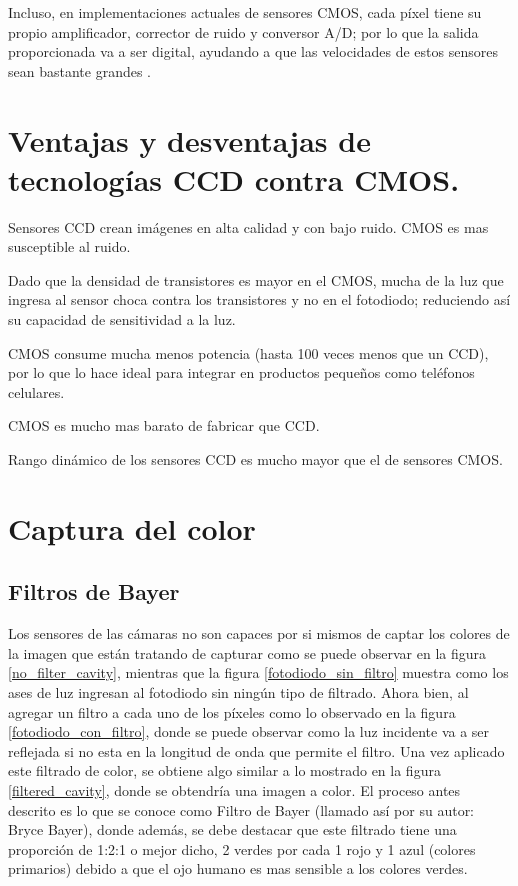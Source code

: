 \documentclass[conference]{IEEEtran}
\begin{document}
Incluso, en implementaciones actuales de sensores CMOS, cada píxel tiene su propio amplificador, corrector de ruido y conversor A/D; por lo que la salida proporcionada va a ser digital, ayudando a que las velocidades de estos sensores sean bastante grandes \cite{ccd_vs_cmos_1}.

\section{\textbf{Ventajas y desventajas de tecnologías CCD contra CMOS.}}
\begin{list}{--}{}
\item
Sensores CCD crean imágenes en alta calidad y con bajo ruido. CMOS es mas susceptible al ruido.
\item
Dado que la densidad de transistores es mayor en el CMOS, mucha de la luz que ingresa al sensor choca contra los transistores y no en el fotodiodo; reduciendo así su capacidad de sensitividad a la luz.
\item
CMOS consume mucha menos potencia (hasta 100 veces menos que un CCD), por lo que lo hace ideal para integrar en productos peque\~nos como teléfonos celulares.
\item
CMOS es mucho mas barato de fabricar que CCD.
\item
Rango dinámico de los sensores CCD es mucho mayor que el de sensores CMOS. 
\end{list}

\section{\textbf{Captura del color}}

\subsection{\textbf{Filtros de Bayer}}
Los sensores de las cámaras no son capaces por si mismos de captar los colores de la imagen que están tratando de capturar como se puede observar en la figura \ref{no_filter_cavity}, mientras que la figura \ref{fotodiodo_sin_filtro} muestra como los ases de luz ingresan al fotodiodo sin ningún tipo de filtrado. Ahora bien, al agregar un filtro a cada uno de los píxeles como lo observado en la figura \ref{fotodiodo_con_filtro}, donde se puede observar como la luz incidente va a ser reflejada si no esta en la longitud de onda que permite el filtro. Una vez aplicado este filtrado de color, se obtiene algo similar a lo mostrado en la figura \ref{filtered_cavity}, donde se obtendría una imagen a color. El proceso antes descrito es lo que se conoce como Filtro de Bayer (llamado así por su autor: Bryce Bayer), donde además, se debe destacar que este filtrado tiene una proporción de 1:2:1 o mejor dicho, 2 verdes por cada 1 rojo y 1 azul (colores primarios) debido a que el ojo humano es mas sensible a los colores verdes\cite{bayer2}.
\end{document}
